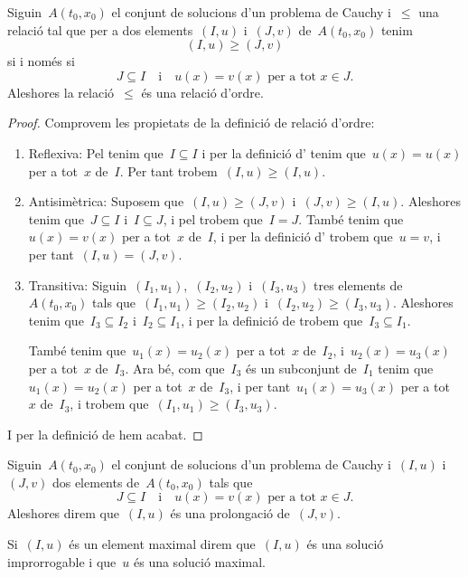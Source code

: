 \documentclass[../../main.tex]{subfiles}
\begin{document}
	\begin{proposition}
		\label{prop:la prolongació és una relació d'ordre}
		Siguin~\(A(t_{0},x_{0})\) el conjunt de solucions d'un problema de Cauchy i~\(\leq\) una relació tal que per a dos elements~\((I,u)\) i~\((J,v)\) de~\(A(t_{0},x_{0})\) tenim
		\[
		    (I,u)\geq(J,v)
		\]
		si i només si
		\[
		    J\subseteq I\quad\text{i}\quad u(x)=v(x)\text{ per a tot }x\in J.
		\]
		Aleshores la relació~\(\leq\) és una relació d'ordre.
		\begin{proof}
			Comprovem les propietats de la definició de relació d'ordre:
			\begin{enumerate}
				\item Reflexiva: Pel  tenim que~\(I\subseteq I\) i per la definició d' tenim que~\(u(x)=u(x)\) per a tot~\(x\) de~\(I\).
				Per tant trobem~\((I,u)\geq(I,u)\).

				\item Antisimètrica: Suposem que~\((I,u)\geq(J,v)\) i~\((J,v)\geq(I,u)\).
				Aleshores tenim que~\(J\subseteq I\) i~\(I\subseteq J\), i pel  trobem que~\(I=J\).
				També tenim que~\(u(x)=v(x)\) per a tot~\(x\) de~\(I\), i per la definició d' trobem que~\(u=v\), i per tant~\((I,u)=(J,v)\).

				\item Transitiva: Siguin~\((I_{1},u_{1})\),~\((I_{2},u_{2})\) i~\((I_{3},u_{3})\) tres elements de~\(A(t_{0},x_{0})\) tals que~\((I_{1},u_{1})\geq(I_{2},u_{2})\) i~\((I_{2},u_{2})\geq(I_{3},u_{3})\).
				Aleshores tenim que~\(I_{3}\subseteq I_{2}\) i~\(I_{2}\subseteq I_{1}\), i per la definició de  trobem que~\(I_{3}\subseteq I_{1}\).

				També tenim que~\(u_{1}(x)=u_{2}(x)\) per a tot~\(x\) de~\(I_{2}\), i~\(u_{2}(x)=u_{3}(x)\) per a tot~\(x\) de~\(I_{3}\).
				Ara bé, com que~\(I_{3}\) és un subconjunt de~\(I_{1}\) tenim que~\(u_{1}(x)=u_{2}(x)\) per a tot~\(x\) de~\(I_{3}\), i per tant~\(u_{1}(x)=u_{3}(x)\) per a tot~\(x\) de~\(I_{3}\), i trobem que~\((I_{1},u_{1})\geq(I_{3},u_{3})\).
			\end{enumerate}
			I per la definició de  hem acabat.
		\end{proof}
	\end{proposition}
	\begin{definition}[Prolongació]
		\label{def:prolongació}
		\label{def:solució improrrogable}
		\label{def:solució maximal}
		Siguin~\(A(t_{0},x_{0})\) el conjunt de solucions d'un problema de Cauchy i~\((I,u)\) i~\((J,v)\) dos elements de~\(A(t_{0},x_{0})\) tals que
		\[
		    J\subseteq I\quad\text{i}\quad u(x)=v(x)\text{ per a tot }x\in J.
		\]
		Aleshores direm que~\((I,u)\) és una prolongació de~\((J,v)\).

		Si~\((I,u)\) és un element maximal direm que~\((I,u)\) és una solució improrrogable i que~\(u\) és una solució maximal.
	\end{definition}
\end{document}
